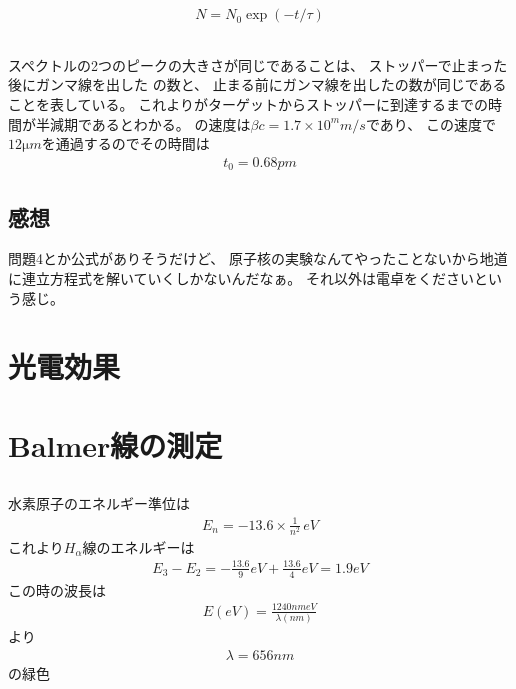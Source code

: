 \documentclass[../../master.tex]{subfiles}
\begin{document}
\subsection{}
\begin{align}
    N = N_0 \exp(-t/\tau)
\end{align}

\subsection{}
スペクトルの2つのピークの大きさが同じであることは、
ストッパーで止まった後にガンマ線を出した の数と、
止まる前にガンマ線を出したの数が同じであることを表している。
これよりがターゲットからストッパーに到達するまでの時間が半減期であるとわかる。
の速度は\(\beta c = 1.7\times 10^m\si{m/s}\)であり、
この速度で\(12\si{\micro m}\)を通過するのでその時間は
\begin{align}
    t_0 =  0.68\si{pm}
\end{align}

\subsection*{感想}
問題4とか公式がありそうだけど、
原子核の実験なんてやったことないから地道に連立方程式を解いていくしかないんだなぁ。
それ以外は電卓をくださいという感じ。

\clearpage
\section{光電効果}

\clearpage
\section{Balmer線の測定}
\subsection{}
水素原子のエネルギー準位は
\begin{align}
    E_n = -13.6\times\frac{1}{n^2} \,\si{eV}
\end{align}
これより\(H_\alpha\)線のエネルギーは
\begin{align}
    E_3 - E_2 = -\frac{13.6}{9} \si{eV} + \frac{13.6}{4} \si{eV} = 1.9 eV
\end{align}
この時の波長は
\begin{align}
    E \si{(eV)} = \frac{1240 \si{nm eV}}{\lambda \si{(nm)}}
\end{align}
より
\begin{align}
    \lambda = 656 \si{nm}
\end{align}
の緑色
\end{document}

